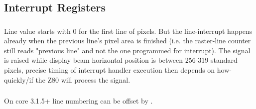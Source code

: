 \pagebreak
\subsection{Interrupt Registers}
\label{zx_next_interrupts_registers}

\subsubsection{}

\begin{NextPort}
\end{NextPort}

Line value starts with 0 for the first line of pixels. But the line-interrupt happens already when the previous line's pixel area is finished (i.e. the raster-line counter still reads "previous line" and not the one programmed for interrupt). The  signal is raised while display beam horizontal position is between 256-319 standard pixels, precise timing of interrupt handler execution then depends on how-quickly/if the Z80 will process the  signal.


\subsubsection{}

\begin{NextPort}
\end{NextPort}

On core 3.1.5+ line numbering can be offset by .


\subsubsection{}

